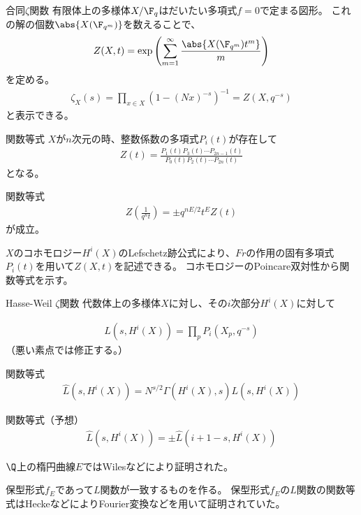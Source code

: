\documentclass[dvipdfmx]{beamer}
\begin{document}
\begin{frame}{合同$\zeta$関数}
  有限体上の多様体$X/\F_q$はだいたい多項式$f=0$で定まる図形。
  これの解の個数$\abs{X(\F_{q^m})}$を数えることで、
  \begin{align*}
    Z(X,t)=\exp\left(\sum_{m=1}^\infty\frac{\abs{X(\F_{q^m})t^m}}{m}\right)
  \end{align*}
  を定める。
  \begin{align*}
    \zeta_X(s)=\prod_{x\in X}(1-(Nx)^{-s})^{-1}=Z(X,q^{-s})
  \end{align*}
  と表示できる。
\end{frame}

\begin{frame}{関数等式}
  $X$が$n$次元の時、整数係数の多項式$P_i(t)$が存在して
  \begin{align*}
    Z(t)=\frac{P_1(t)P_3(t)\cdots P_{2n-1}(t)}{P_0(t)P_2(t)\cdots P_{2n}(t)}
  \end{align*}
  となる。
  
  関数等式
  \begin{align*}
    Z(\frac{1}{q^nt})=\pm q^{nE/2}t^EZ(t)
  \end{align*}
  が成立。
  
  $X$のコホモロジー$H^i(X)$のLefschetz跡公式により、$Fr$の作用の固有多項式$P_i(t)$を用いて$Z(X,t)$を記述できる。
  コホモロジーのPoincare双対性から関数等式を示す。
\end{frame}

\begin{frame}{Hasse-Weil $\zeta$関数}
  代数体上の多様体$X$に対し、その$i$次部分$H^i(X)$に対して

  \begin{align*}
    L(s,H^i(X))=\prod_pP_i(X_p,q^{-s})
  \end{align*}
  （悪い素点では修正する。）

\end{frame}

\begin{frame}{関数等式}
  \begin{align*}
    \hat{L}(s,H^i(X))=N^{s/2}\Gamma(H^i(X),s)L(s,H^i(X))
  \end{align*}
  
  関数等式（予想）
  \begin{align*}
    \hat{L}(s,H^i(X))=\pm\hat{L}(i+1-s,H^i(X))
  \end{align*}
  
  $\Q$上の楕円曲線$E$ではWilesなどにより証明された。
  
  保型形式$f_E$であって$L$関数が一致するものを作る。
  保型形式$f_E$の$L$関数の関数等式はHeckeなどによりFourier変換などを用いて証明されていた。
\end{frame}
\end{document}
